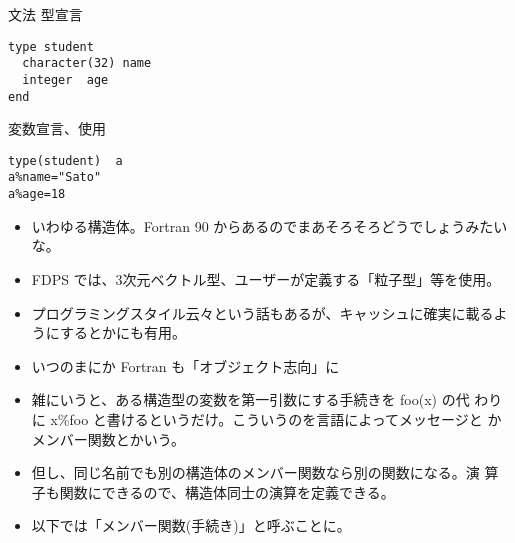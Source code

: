 \documentclass[12pt,dvipdfmx]{article}
\begin{document}
文法 型宣言
\begin{verbatim}
type student
  character(32) name
  integer  age
end
\end{verbatim}

変数宣言、使用
\begin{verbatim}
type(student)  a
a%name="Sato"
a%age=18
\end{verbatim}



\begin{itemize}

\item いわゆる構造体。Fortran 90 からあるのでまあそろそろどうでしょうみたいな。

\item FDPS では、3次元ベクトル型、ユーザーが定義する「粒子型」等を使用。

\item プログラミングスタイル云々という話もあるが、キャッシュに確実に載るようにするとかにも有用。


\end{itemize}


\begin{itemize}

\item いつのまにか Fortran も「オブジェクト志向」に

\item 雑にいうと、ある構造型の変数を第一引数にする手続きを foo(x) の代
わりに x\%foo と書けるというだけ。こういうのを言語によってメッセージと
かメンバー関数とかいう。
        
\item 但し、同じ名前でも別の構造体のメンバー関数なら別の関数になる。演
算子も関数にできるので、構造体同士の演算を定義できる。

\item 以下では「メンバー関数(手続き)」と呼ぶことに。

\end{itemize}


\large \bf
\end{document}
